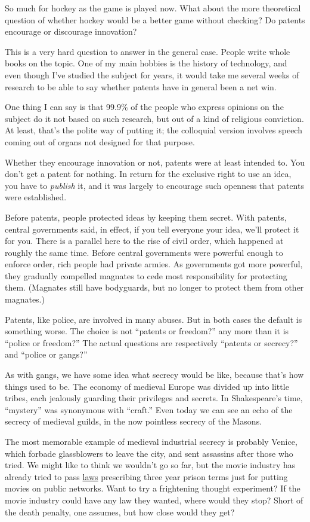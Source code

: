 So much for hockey as the game is played now. What about the more
theoretical question of whether hockey would be a better game without
checking? Do patents encourage or discourage innovation?

This is a very hard question to answer in the general case. People write
whole books on the topic. One of my main hobbies is the history of
technology, and even though I've studied the subject for years, it would
take me several weeks of research to be able to say whether patents have
in general been a net win.

One thing I can say is that 99.9\% of the people who express opinions on
the subject do it not based on such research, but out of a kind of
religious conviction. At least, that's the polite way of putting it; the
colloquial version involves speech coming out of organs not designed for
that purpose.

Whether they encourage innovation or not, patents were at least intended
to. You don't get a patent for nothing. In return for the exclusive
right to use an idea, you have to \emph{publish} it, and it was largely
to encourage such openness that patents were established.

Before patents, people protected ideas by keeping them secret. With
patents, central governments said, in effect, if you tell everyone your
idea, we'll protect it for you. There is a parallel here to the rise of
civil order, which happened at roughly the same time. Before central
governments were powerful enough to enforce order, rich people had
private armies. As governments got more powerful, they gradually
compelled magnates to cede most responsibility for protecting them.
(Magnates still have bodyguards, but no longer to protect them from
other magnates.)

Patents, like police, are involved in many abuses. But in both cases the
default is something worse. The choice is not ``patents or freedom?''
any more than it is ``police or freedom?'' The actual questions are
respectively ``patents or secrecy?'' and ``police or gangs?''

As with gangs, we have some idea what secrecy would be like, because
that's how things used to be. The economy of medieval Europe was divided
up into little tribes, each jealously guarding their privileges and
secrets. In Shakespeare's time, ``mystery'' was synonymous with
``craft.'' Even today we can see an echo of the secrecy of medieval
guilds, in the now pointless secrecy of the Masons.

The most memorable example of medieval industrial secrecy is probably
Venice, which forbade glassblowers to leave the city, and sent assassins
after those who tried. We might like to think we wouldn't go so far, but
the movie industry has already tried to pass
\href{http://news.com.com/2100-1026_3-5106684.html}{laws} prescribing
three year prison terms just for putting movies on public networks. Want
to try a frightening thought experiment? If the movie industry could
have any law they wanted, where would they stop? Short of the death
penalty, one assumes, but how close would they get?

